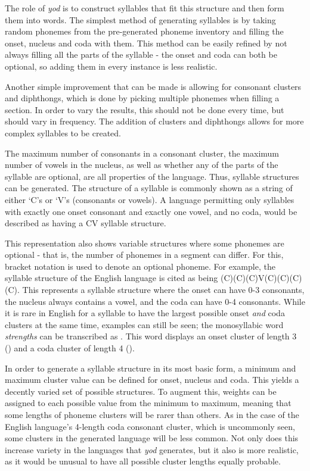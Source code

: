 \documentclass{report}
\begin{document}
	The role of \textit{yod} is to construct syllables that fit this structure and then form them into words. The simplest method of generating syllables is by taking random phonemes from the pre-generated phoneme inventory and filling the onset, nucleus and coda with them. This method can be easily refined by not always filling all the parts of the syllable - the onset and coda can both be optional, so adding them in every instance is less realistic.
	
	Another simple improvement that can be made is allowing for consonant clusters and diphthongs, which is done by picking multiple phonemes when filling a section. In order to vary the results, this should not be done every time, but should vary in frequency. The addition of clusters and diphthongs allows for more complex syllables to be created.
	
	The maximum number of consonants in a consonant cluster, the maximum number of vowels in the nucleus, as well as whether any of the parts of the syllable are optional, are all properties of the language. Thus, syllable structures can be generated. The structure of a syllable is commonly shown as a string of either `C's or `V's (consonants or vowels)\cite{clements1985cv}. A language permitting only syllables with exactly one onset consonant and exactly one vowel, and no coda, would be described as having a CV syllable structure.
	
	This representation also shows variable structures where some phonemes are optional - that is, the number of phonemes in a segment can differ. For this, bracket notation is used to denote an optional phoneme. For example, the syllable structure of the English language is cited as being (C)(C)(C)V(C)(C)(C)(C). This represents a syllable structure where the onset can have 0-3 consonants, the nucleus always contains a vowel, and the coda can have 0-4 consonants. While it is rare in English for a syllable to have the largest possible onset \textit{and} coda clusters at the same time, examples can still be seen; the monosyllabic word \textit{strengths} can be transcribed as . This word displays an onset cluster of length 3 () and a coda cluster of length 4 ().
	
	In order to generate a syllable structure in its most basic form, a minimum and maximum cluster value can be defined for onset, nucleus and coda. This yields a decently varied set of possible structures. To augment this, weights can be assigned to each possible value from the minimum to maximum, meaning that some lengths of phoneme clusters will be rarer than others. As in the case of the English language's 4-length coda consonant cluster, which is uncommonly seen, some clusters in the generated language will be less common. Not only does this increase variety in the languages that \textit{yod} generates, but it also is more realistic, as it would be unusual to have all possible cluster lengths equally probable.
	
\end{document}
